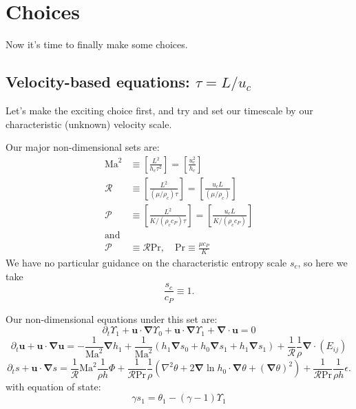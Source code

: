\documentclass{aastex631}
\newcommand{\del}{\nabla}
\renewcommand{\vec}{\boldsymbol}
\newcommand{\grad}{\vec{\del}}
\newcommand{\scrR}{\mathcal{R}}
\newcommand{\scrP}{\mathcal{P}}
\newcommand{\Ma}{\mathrm{Ma}}
\renewcommand{\Pr}{\mathrm{Pr}}
\begin{document}
\section{Choices}
Now it's time to finally make some choices.

\subsection{Velocity-based equations: $\tau = L/u_c$}
Let's make the exciting choice first, and try and set our timescale by our characteristic (unknown) velocity scale.

Our major non-dimensional sets are:
\begin{align}
\Ma^{2} & \equiv \left[\frac{L^2}{h_c \tau^2}\right] = \left[\frac{u_c^2}{h_c}\right] \\
\scrR & \equiv \left[\frac{L^2}{(\mu/\rho_c) \tau}\right] = \left[\frac{u_c L}{(\mu/\rho_c)}\right] \\
\scrP & \equiv \left[\frac{L^2}{K/(\rho_c c_P)\tau}\right] = \left[\frac{u_c L}{K/(\rho_c c_P)}\right] \\
\text{and} \nonumber \\
\scrP &\equiv \scrR \Pr, \quad \Pr \equiv \frac{\mu c_P}{K}
\end{align}
We have no particular guidance on the characteristic entropy scale $s_c$, so here we take
\begin{equation}
  \frac{s_c}{c_P} \equiv 1.
\end{equation}

Our non-dimensional equations under this set are:
\begin{equation}
  \partial_t \Upsilon_1 + \vec{u}\cdot\grad \Upsilon_0 + \vec{u}\cdot\grad \Upsilon_1 + \grad \cdot \vec{u} = 0
\end{equation}
\begin{equation}
  \partial_t \vec{u} + \vec{u}\cdot\grad\vec{u} =
  -\frac{1}{\Ma^2}\grad h_1
  + \frac{1}{\Ma^2} \left(h_1\grad s_0 + h_0\grad s_1 + h_1 \grad s_1\right) + \frac{1}{\scrR}\frac{1}{\rho} \grad \cdot (E_{ij})
\end{equation}
\begin{equation}
  \partial_t s + \vec{u}\cdot\grad s =
  \frac{1}{\scrR} \Ma^2  \frac{1}{\rho h} \Phi
  + \frac{1}{\scrR \Pr} \frac{1}{\rho}\left(\nabla^2 \theta + 2 \grad \ln h_0 \cdot \grad \theta + (\grad \theta)^2\right)
  + \frac{1}{\scrR \Pr} \frac{1}{\rho h} \epsilon.
\end{equation}
with equation of state:
\begin{equation}
  \gamma s_1 = \theta_1 - (\gamma - 1)\Upsilon_1
\end{equation}
\end{document}
